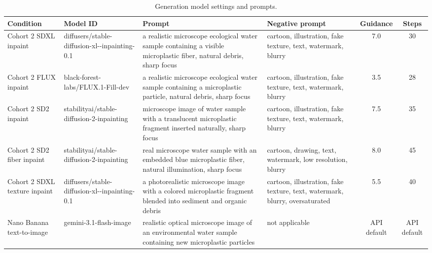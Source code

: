 \documentclass{article}
\begin{document}
\begin{table}[H]
  \centering
  \scriptsize
  \setlength{\tabcolsep}{3pt}
  \caption{Generation model settings and prompts.}
  \label{tab:appendix-generation-settings}
  \begin{tabular}{@{}p{}p{}p{}p{}cc@{}}
    \toprule
    \textbf{Condition} & \textbf{Model ID} & \textbf{Prompt} & \textbf{Negative prompt} & \textbf{Guidance} & \textbf{Steps} \\
    \midrule
    Cohort 2 SDXL inpaint &
    diffusers/stable-diffusion-xl-\newline 1.0-inpainting-0.1 &
    a realistic microscope ecological water sample containing a visible microplastic fiber, natural debris, sharp focus &
    cartoon, illustration, fake texture, text, watermark, blurry &
    7.0 & 30 \\
    Cohort 2 FLUX inpaint &
    black-forest-labs/\newline FLUX.1-Fill-dev &
    a realistic microscope ecological water sample containing a microplastic particle, natural debris, sharp focus &
    cartoon, illustration, fake texture, text, watermark, blurry &
    3.5 & 28 \\
    Cohort 2 SD2 inpaint &
    stabilityai/stable-diffusion-2-\newline inpainting &
    microscope image of water sample with a translucent microplastic fragment inserted naturally, sharp focus &
    cartoon, illustration, fake texture, text, watermark, blurry &
    7.5 & 35 \\
    Cohort 2 SD2 fiber inpaint &
    stabilityai/stable-diffusion-2-\newline inpainting &
    real microscope water sample with an embedded blue microplastic fiber, natural illumination, sharp focus &
    cartoon, drawing, text, watermark, low resolution, blurry &
    8.0 & 45 \\
    Cohort 2 SDXL texture inpaint &
    diffusers/stable-diffusion-xl-\newline 1.0-inpainting-0.1 &
    a photorealistic microscope image with a colored microplastic fragment blended into sediment and organic debris &
    cartoon, illustration, fake texture, text, watermark, blurry, oversaturated &
    5.5 & 40 \\
    Nano Banana text-to-image &
    gemini-3.1-\newline flash-image &
    realistic optical microscope image of an environmental water sample containing new microplastic particles &
    not applicable &
    API default & API default \\
    \bottomrule
  \end{tabular}
\end{table}
\end{document}
